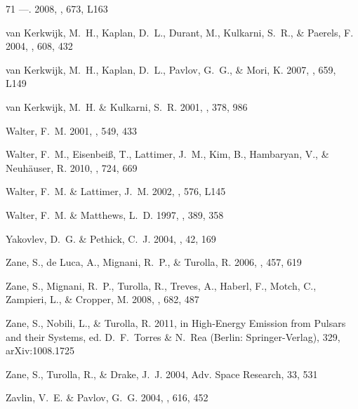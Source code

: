 \documentclass[iop]{emulateapj}
\begin{document}
\begin{thebibliography}{71}
---. 2008, \apjl, 673, L163

{van Kerkwijk}, M.~H., {Kaplan}, D.~L., {Durant}, M., {Kulkarni}, S.~R., \&
  {Paerels}, F. 2004, \apj, 608, 432

{van Kerkwijk}, M.~H., {Kaplan}, D.~L., {Pavlov}, G.~G., \& {Mori}, K. 2007,
  \apjl, 659, L149

{van Kerkwijk}, M.~H. \& {Kulkarni}, S.~R. 2001, \aap, 378, 986

{Walter}, F.~M. 2001, \apj, 549, 433

{Walter}, F.~M., {Eisenbei{\ss}}, T., {Lattimer}, J.~M., {Kim}, B.,
  {Hambaryan}, V., \& {Neuh{\"a}user}, R. 2010, \apj, 724, 669

{Walter}, F.~M. \& {Lattimer}, J.~M. 2002, \apjl, 576, L145

{Walter}, F.~M. \& {Matthews}, L.~D. 1997, \nat, 389, 358

{Yakovlev}, D.~G. \& {Pethick}, C.~J. 2004, \araa, 42, 169

{Zane}, S., {de Luca}, A., {Mignani}, R.~P., \& {Turolla}, R. 2006, \aap, 457,
  619

{Zane}, S., {Mignani}, R.~P., {Turolla}, R., {Treves}, A., {Haberl}, F.,
  {Motch}, C., {Zampieri}, L., \& {Cropper}, M. 2008, \apj, 682, 487

{Zane}, S., {Nobili}, L., \& {Turolla}, R. 2011, in High-Energy Emission from
  Pulsars and their Systems, ed. {D.~F.~Torres \& N.~Rea} (Berlin:
  Springer-Verlag), 329, arXiv:1008.1725

{Zane}, S., {Turolla}, R., \& {Drake}, J.~J. 2004, Adv. Space Research, 33, 531

{Zavlin}, V.~E. \& {Pavlov}, G.~G. 2004, \apj, 616, 452

\end{thebibliography}
\end{document}
